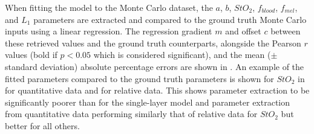 When fitting the model to the Monte Carlo dataset, the $a$, $b$, $StO_2$, $f_{blood}$, $f_{mel}$, and $L_1$ parameters are extracted and compared to the ground truth Monte Carlo inputs using a linear regression. The regression gradient $m$ and offset $c$ between these retrieved values and the ground truth counterparts, alongside the Pearson $r$ values (bold if $p<0.05$ which is considered significant), and the mean ($\pm$ standard deviation) absolute percentage errors are shown in . An example of the fitted parameters compared to the ground truth parameters is shown for $StO_2$ in   for quantitative data and   for relative data. This shows parameter extraction to be significantly poorer than for the single-layer model and parameter extraction from quantitative data performing similarly that of relative data for $StO_2$ but better for all others. 
